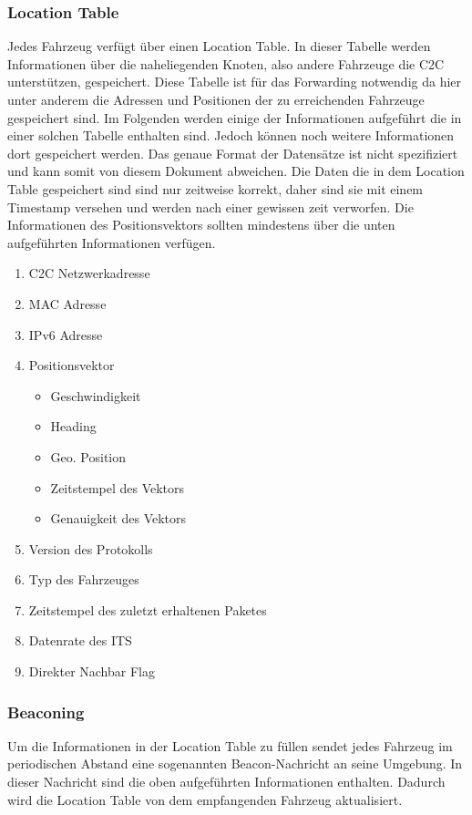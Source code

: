 \subsubsection{Location Table}
Jedes Fahrzeug verfügt über einen Location Table. In dieser Tabelle werden Informationen über die naheliegenden Knoten, also andere Fahrzeuge die C2C unterstützen, gespeichert. Diese Tabelle ist für das Forwarding notwendig da hier unter anderem die Adressen und Positionen der zu erreichenden Fahrzeuge gespeichert sind. 
Im Folgenden werden einige der Informationen aufgeführt die in einer solchen Tabelle enthalten sind. Jedoch können noch weitere Informationen dort gespeichert werden. Das genaue Format der Datensätze ist nicht spezifiziert und kann somit von diesem Dokument abweichen. Die Daten die in dem Location Table gespeichert sind sind nur zeitweise korrekt, daher sind sie mit einem Timestamp versehen und werden nach einer gewissen zeit verworfen. Die Informationen des Positionsvektors sollten mindestens über die unten aufgeführten Informationen verfügen. 
\begin{enumerate}
      \item C2C Netzwerkadresse
      \item MAC Adresse
      \item IPv6 Adresse
      \item Positionsvektor
      \begin{itemize}
      	\item Geschwindigkeit
	\item Heading
	\item Geo. Position
	\item Zeitstempel des Vektors
	\item Genauigkeit des Vektors
      \end{itemize}
      \item Version des Protokolls
      \item Typ des Fahrzeuges
      \item Zeitstempel des zuletzt erhaltenen Paketes
      \item Datenrate des ITS
      \item Direkter Nachbar Flag
\end{enumerate}

\subsubsection{Beaconing}
Um die Informationen in der Location Table zu füllen sendet jedes Fahrzeug im periodischen Abstand eine sogenannten Beacon-Nachricht an seine Umgebung. In dieser Nachricht sind die oben aufgeführten Informationen enthalten. Dadurch wird die Location Table von dem empfangenden Fahrzeug aktualisiert.

